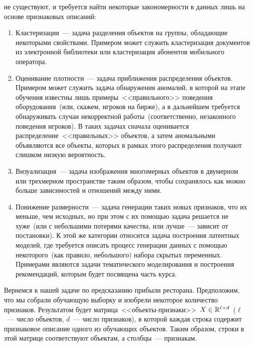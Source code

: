 \documentclass[12pt,fleqn]{article}
\begin{document}
не существуют, и требуется найти некоторые закономерности в данных лишь
на основе признаковых описаний:
\begin{enumerate}
    \item Кластеризация~--- задача разделения объектов на группы, обладающие
        некоторыми свойствами. Примером может служить кластеризация документов из
        электронной библиотеки или кластеризация абонентов мобильного оператора.
    \item Оценивание плотности~--- задача приближения распределения объектов.
        Примером может служить задача обнаружения аномалий, в которой
        на этапе обучения известны лишь примеры~<<правильного>> поведения оборудования~(или, скажем,
        игроков на бирже), а в дальнейшем требуется обнаруживать случаи
        некорректной работы~(соответственно, незаконного поведения игроков).
        В таких задачах сначала оценивается распределение~<<правильных>> объектов,
        а затем аномальными объявляются все объекты, которых в рамках этого
        распределения получают слишком низкую вероятность.
    \item Визуализация~--- задача изображения многомерных объектов
        в двумерном или трехмерном пространстве таким образом,
        чтобы сохранялось как можно больше зависимостей и отношений между ними.
    \item Понижение размерности~--- задача генерации таких новых признаков,
        что их меньше, чем исходных, но при этом с их помощью задача решается не хуже~(или с небольшими
        потерями качества, или лучше~--- зависит от постановки).
        К этой же категории относится задача построения латентных моделей, где требуется описать
        процесс генерации данных с помощью некоторого~(как правило, небольшого) набора скрытых
        переменных.
        Примерами являются задачи тематического моделирования и построения рекомендаций,
        которым будет посвящена часть курса.
\end{enumerate}

Вернемся к нашей задаче по предсказанию прибыли ресторана.
Предположим, что мы собрали обучающую выборку и изобрели некоторое количество признаков.
Результатом будет матрица~<<объекты-признаки>>~$X \in \RR^{\ell \times d}$~($\ell$~---
число объектов, $d$~--- число признаков), в которой каждая строка
содержит признаковое описание одного из обучающих объектов.
Таким образом, строки в этой матрице соответствуют объектам, а столбцы~--- признакам.
\end{document}
